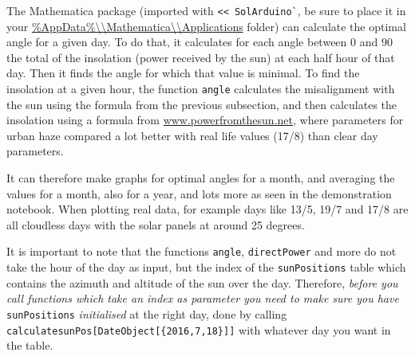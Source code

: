 \documentclass{article}
\begin{document}
			   The Mathematica package (imported with \verb|<< SolArduino`|, be sure to place it in your
			    \url{\%AppData\%\\Mathematica\\Applications} folder) can calculate the optimal angle for a given day. To do that, it calculates for each angle between $0$ and $90$ the total of the insolation (power received by the sun) at each half hour of that day. Then it finds the angle for which that value is minimal. To find the insolation at a given hour, the function \verb|angle| calculates the misalignment with the sun using the formula from the previous subsection, and then calculates the insolation using a formula from \href{http://www.powerfromthesun.net/Book/chapter02/chapter02.html#ZEqnNum929295 }{www.powerfromthesun.net}, where parameters for urban haze compared a lot better with real life values (17/8) than clear day parameters.
			   
			   It can therefore make graphs for optimal angles for a month, and averaging the values for a month, also for a year, and lots more as seen in the demonstration notebook. When plotting real data, for example days like  13/5, 19/7 and 17/8 are all cloudless days with the solar panels at around 25 degrees.
			   
			   It is important to note that the functions \verb|angle|, \verb|directPower| and more do not take the hour of the day as input, but the index of the \verb|sunPositions| table which contains the azimuth and altitude of the sun over the day. Therefore, \textit{before you call functions which take an index as parameter you need to make sure you have }\verb|sunPositions| \textit{initialised} at the right day, done by calling \verb|calculatesunPos[DateObject[{2016,7,18}]]| with whatever day you want in the table.
			   	
\end{document}
